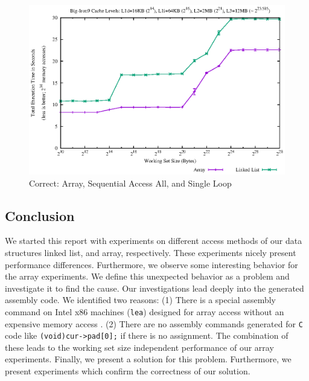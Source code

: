 \begin{figure}[htbp]
\centering
\includegraphics{appendix/plots-cache-measurements/plot-bi9-correct-array-ll}
\caption{Correct: Array, Sequential Access All, and Single Loop}
\label{app:correct-arr-seqaccall-sl-bi9}
\end{figure}

\subsection{Conclusion}\label{conclusion-5}

We started this report with experiments on different access methods of
our data structures linked list, and array, respectively. These
experiments nicely present performance differences. Furthermore, we
observe some interesting behavior for the array experiments. We define
this unexpected behavior as a problem and investigate it to find the
cause. Our investigations lead deeply into the generated assembly code.
We identified two reasons: (1) There is a special assembly command on
Intel x86 machines (\texttt{lea}) designed for array access without an
expensive memory access . (2) There are no assembly commands generated
for \texttt{C} code like \texttt{(void)cur-\textgreater{}pad{[}0{]};} if
there is no assignment. The combination of these leads to the working
set size independent performance of our array experiments. Finally, we
present a solution for this problem. Furthermore, we present experiments
which confirm the correctness of our solution.
